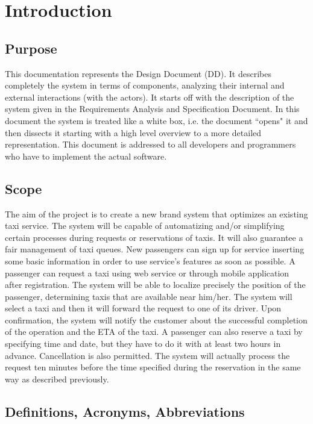 \break
\section{Introduction}
\subsection{Purpose}
This documentation represents the Design Document (DD). It describes completely the system in terms of components, analyzing their internal and external interactions (with the actors). It starts off with the description of the system given in the Requirements Analysis and Specification Document. In this document the system is treated like a white box, i.e. the document ``opens" it and then dissects it starting with a high level overview to a more detailed representation. This document is addressed to all developers and programmers who have to implement the actual software.
\subsection{Scope}
The aim of the project is to create a new brand system that optimizes an 
existing taxi service.
The system will be capable of automatizing and/or simplifying certain 
processes during requests or reservations of taxis.
It will also guarantee a fair management of taxi queues.
New passengers can sign up for service inserting some basic information in order to use service's features as soon as possible.
A passenger can request a taxi using web service or through mobile
application after registration. The system will be able to localize precisely the position
of the passenger, determining taxis that are available near
him/her. The system will select a taxi and then it will forward the request to one of its driver.
Upon confirmation, the system will notify the customer about the successful completion of the operation and the ETA of the taxi. A passenger can also reserve a taxi by specifying time and date, but they have to do it with at least two hours in advance. Cancellation is also permitted. The system will actually process the request ten minutes before the time specified during the reservation in the same way as described previously.
\subsection{Definitions, Acronyms, Abbreviations}
